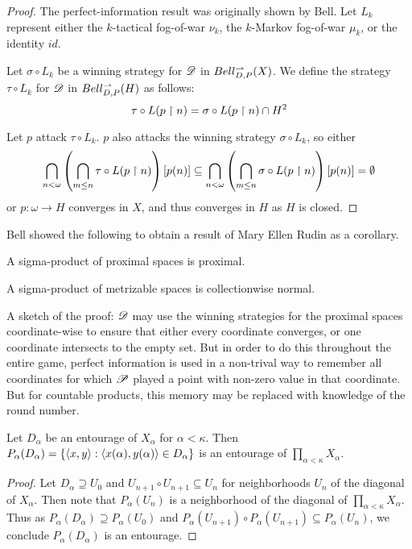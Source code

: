 \begin{proof}
  The perfect-information result was originally shown by Bell.
  Let $L_k$ represent either the $k$-tactical fog-of-war $\nu_k$,
  the $k$-Markov fog-of-war $\mu_k$, or the identity $id$.

  Let $\sigma\circ L_k$ be a winning strategy for $\mathscr{D}$ in $Bell_{D,P}^{\rightharpoonup}(X)$.
  We define the strategy $\tau\circ L_k$ for $\mathscr{D}$ in $Bell_{D,P}^{\rightharpoonup}(H)$ as
  follows:
    \[
      \tau\circ L(p\restriction n)
        =
      \sigma\circ L(p\restriction n)
        \cap
      H^2
    \]

  Let $p$ attack $\tau\circ L_k$. $p$ also attacks the winning strategy
  $\sigma\circ L_k$, so either
    \[
      \bigcap_{n<\omega}
      \left(\bigcap_{m\leq n}\tau\circ L(p\restriction n)\right)
      [p(n)]
        \subseteq
      \bigcap_{n<\omega}
      \left(\bigcap_{m\leq n}\sigma\circ L(p\restriction n)\right)
      [p(n)]
        =
      \emptyset
    \]
  or $p:\omega\to H$ converges in $X$, and thus converges in $H$ as $H$ is
  closed.
\end{proof}

Bell showed the following to obtain a result of Mary Ellen Rudin \cite{MR716576}
as a corollary.

\begin{thm}
  A sigma-product of proximal spaces is proximal.
\end{thm}

\begin{cor}
  A sigma-product of metrizable spaces is collectionwise normal.
\end{cor}

A sketch of the proof: $\mathscr{D}$ may use the winning strategies for the
proximal spaces coordinate-wise to ensure that either every coordinate
converges, or one coordinate intersects to the empty set. But in order to do
this throughout the entire game, perfect information is used in a non-trival
way to remember all coordinates for which $\mathscr{P}$ played a point with
non-zero value in that coordinate. But for countable products, this memory
may be replaced with knowledge of the round number.

\begin{lem}
  Let $D_\alpha$ be an entourage of $X_\alpha$ for $\alpha<\kappa$. Then
  $P_\alpha(D_\alpha)=\{\langle x,y\rangle:\langle x(\alpha),y(\alpha)\rangle\in D_\alpha\}$
  is an entourage of $\prod_{\alpha<\kappa} X_\alpha$.
\end{lem}

\begin{proof}
  Let $D_\alpha\supseteq U_0$ and $U_{n+1}\circ U_{n+1}\subseteq U_n$ for
  neighborhoods $U_n$ of the diagonal of $X_\alpha$. Then note that
  $P_\alpha(U_{n})$ is a neighborhood of the diagonal of
  $\prod_{\alpha<\kappa} X_\alpha$. Thus as
  $P_\alpha(D_\alpha) \supseteq P_\alpha(U_0)$ and
  $P_\alpha(U_{n+1})\circ P_\alpha(U_{n+1})\subseteq P_\alpha(U_{n})$,
  we conclude $P_\alpha(D_\alpha)$ is an entourage.
\end{proof}

